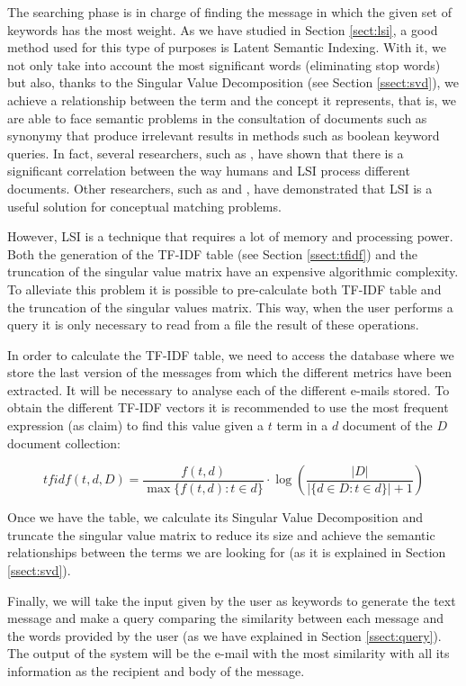 The searching phase is in charge of finding the message in which the given set of keywords has the most weight. As we have studied in Section \ref{sect:lsi}, a good method used for this type of purposes is Latent Semantic Indexing. With it, we not only take into account the most significant words (eliminating stop words) but also, thanks to the Singular Value Decomposition (see Section \ref{ssect:svd}), we achieve a relationship between the term and the concept it represents, that is, we are able to face semantic problems in the consultation of documents such as synonymy that produce irrelevant results in methods such as boolean keyword queries. In fact, several researchers, such as \cite{landauer1998learning}, have shown that there is a significant correlation between the way humans and LSI process different documents. Other researchers, such as \cite{bartell1992latent} and \cite{ding1999similarity}, have demonstrated that LSI is a useful solution for conceptual matching problems.

However, LSI is a technique that requires a lot of memory and processing power. Both the generation of the TF-IDF table (see Section \ref{ssect:tfidf}) and the truncation of the singular value matrix have an expensive algorithmic complexity. To alleviate this problem it is possible to pre-calculate both TF-IDF table and the truncation of the singular values matrix. This way, when the user performs a query it is only necessary to read from a file the result of these operations.

In order to calculate the TF-IDF table, we need to access the database where we store the last version of the messages from which the different metrics have been extracted. It will be necessary to analyse each of the different e-mails stored. To obtain the different TF-IDF vectors it is recommended to use the most frequent expression (as \cite{tang2014email} claim) to find this value given a $t$ term in a $d$ document of the $D$ document collection:

$$
tfidf(t,d,D) = \frac{f(t,d)}{\max\{ f(t,d):t\in d\}}\cdot\log\left(\frac{\lvert D\rvert}{\lvert \{ d\in D: t\in d\}\rvert+1}\right)
$$

Once we have the table, we calculate its Singular Value Decomposition and truncate the singular value matrix to reduce its size and achieve the semantic relationships between the terms we are looking for (as it is explained in Section \ref{ssect:svd}).

Finally, we will take the input given by the user as keywords to generate the text message and make a query comparing the similarity between each message and the words provided by the user (as we have explained in Section \ref{ssect:query}). The output of the system will be the e-mail with the most similarity with all its information as the recipient and body of the message.